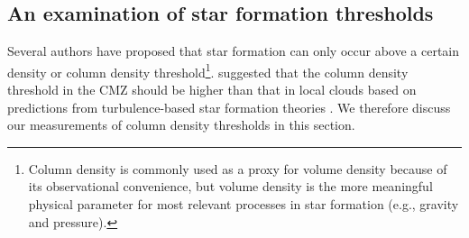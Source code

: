 \documentclass[twocolumn]{aastex61}
\newcommand{\dsgrb}{\ensuremath{8.4\textrm{~kpc}}\xspace}
\begin{document}
\subsection{An examination of star formation thresholds}
\label{sec:thresholds}
Several authors \citep[e.g.,][]{Lada2010a,Heiderman2010a} have proposed that star
formation can only occur above a certain density or column density
threshold\footnote{Column density is commonly used as a proxy for volume
density because of its observational convenience, but volume density is the
more meaningful physical parameter for most relevant processes in star formation
(e.g., gravity and pressure).}.  \citet{Kruijssen2014c} suggested that the
column density threshold in the CMZ should be higher than that in local clouds
based on predictions from turbulence-based star formation theories
\citep{Krumholz2005c,Padoan2011b}.
We therefore discuss our measurements of column density thresholds in this
section.




\end{document}
